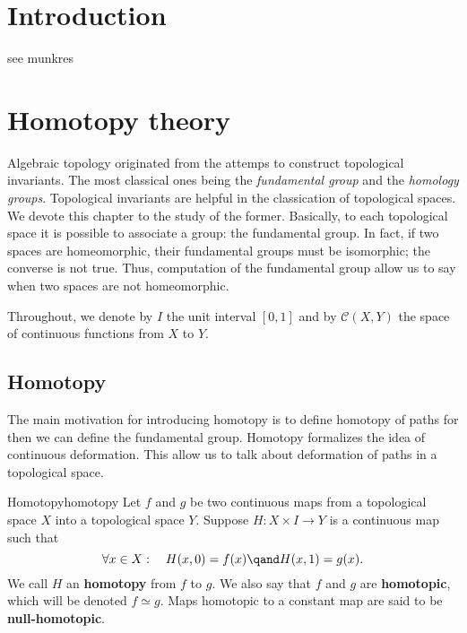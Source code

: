 \chapter{Introduction}


\begin{theorem}
    see munkres
\end{theorem}

\chapter{Homotopy theory}




Algebraic topology originated from the attemps to construct topological invariants. The most classical ones being the \textit{fundamental group} and the \textit{homology groups}. Topological invariants are helpful in the classication of topological spaces. We  devote this chapter  to the study of the former. Basically,  to each topological space it is possible to associate a group: the fundamental group. In fact, if two spaces are homeomorphic, their fundamental groups must be isomorphic; the converse is not true. Thus, computation of the fundamental group allow us to say when two spaces are not homeomorphic. 

Throughout, we denote  by \(I\) the unit interval \([0,1]\) and by \(\mathcal{C}(X,Y)\) the space of continuous functions from \(X\) to \(Y\).


\section{Homotopy}

The main motivation for introducing homotopy is to define homotopy of paths for then we can define the fundamental group.
Homotopy formalizes the idea of continuous deformation. 
This allow us to talk about deformation of paths in a topological space.


\begin{definition}{Homotopy}{homotopy}
    Let \(f\) and \(g\) be two continuous maps from a topological space \(X\) into a topological space \(Y\). Suppose \(H \colon X\times I \to Y\) is a continuous map such that 
    \[
        \forall x\in X :\quad H(x,0) = f(x) \qand H(x,1) = g(x).
    \]
    We call \(H\) an \textbf{homotopy} from \(f\) to \(g\). We also say that \(f\) and \(g\) are \textbf{homotopic}, which will be denoted \(f\simeq g\). Maps homotopic to a constant map are said to be \textbf{null-homotopic}.
\end{definition}

